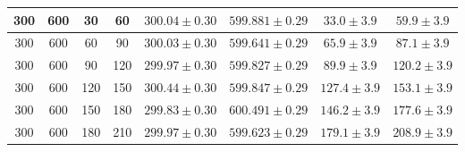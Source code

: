 \documentclass{cmspaper}
\begin{document}
\begin{table} [th]
\begin{tabular}{|c|c|c|c|c|c|c|c|}
300& 600& 30&    60&$ 300.04 \pm   0.30$&$ 599.881  \pm 0.29 $&$ 33.0 \pm  3.9  $&$ 59.9\pm 3.9  $ \\ \hline
300& 600& 60&    90&$ 300.03 \pm   0.30$&$  599.641 \pm 0.29 $&$  65.9\pm  3.9   $&$ 87.1 \pm 3.9  $ \\ \hline
300& 600& 90&   120&$ 299.97 \pm   0.30$&$ 599.827  \pm 0.29 $&$ 89.9 \pm  3.9   $&$120.2  \pm 3.9  $ \\ \hline
300& 600&120&   150&$ 300.44 \pm   0.30$&$ 599.847  \pm 0.29 $&$ 127.4 \pm  3.9  $&$ 153.1 \pm  3.9  $ \\ \hline
300& 600&150&   180&$ 299.83 \pm   0.30$&$ 600.491\pm 0.29 $&$ 146.2 \pm  3.9  $&$ 177.6  \pm  3.9  $ \\ \hline
300& 600&180&   210&$ 299.97 \pm   0.30$&$ 599.623  \pm 0.29 $&$  179.1\pm 3.9   $&$208.9  \pm 3.9  $ \\ \hline
\end{tabular}
\begin{center}

\end{center}
\end{table}


\end{document}
